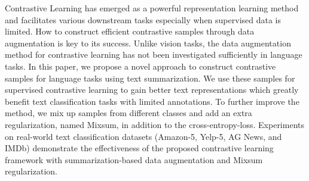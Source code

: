 Contrastive Learning has emerged as a powerful representation learning method and facilitates various downstream tasks especially when supervised data is limited. How to construct efficient contrastive samples through data augmentation is key to its success. Unlike vision tasks, the data augmentation method for contrastive learning has not been investigated sufficiently in language tasks. In this paper, we propose a novel approach to construct contrastive samples for language tasks using text summarization. We use these samples for supervised contrastive learning to gain better text representations which greatly benefit text classification tasks with limited annotations. To further improve the method, we mix up samples from different classes and add an extra regularization, named Mixsum, in addition to the cross-entropy-loss. Experiments on real-world text classification datasets (Amazon-5, Yelp-5, AG News, and IMDb) demonstrate the effectiveness of the proposed contrastive learning framework with summarization-based data augmentation and Mixsum regularization.
